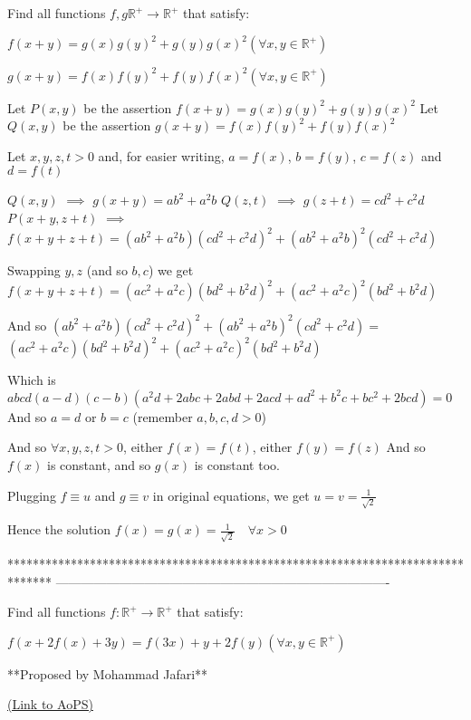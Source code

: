 \begin{solution}
	\begin{tcolorbox}Find all functions $f,g \mathbb{R}^{+} \to \mathbb{R}^{+}$ that satisfy:

$f(x+y)=g(x)g(y)^2+g(y)g(x)^2 (\forall x,y \in \mathbb{R}^{+})$

$g(x+y)=f(x)f(y)^2+f(y)f(x)^2 (\forall x,y \in \mathbb{R}^{+})$\end{tcolorbox}
Let $P(x,y)$ be the assertion $f(x+y)=g(x)g(y)^2+g(y)g(x)^2$
Let $Q(x,y)$ be the assertion $g(x+y)=f(x)f(y)^2+f(y)f(x)^2$

Let $x,y,z,t>0$ and, for easier writing, $a=f(x)$, $b=f(y)$, $c=f(z)$ and $d=f(t)$

$Q(x,y)$ $\implies$ $g(x+y)=ab^2+a^2b$
$Q(z,t)$ $\implies$ $g(z+t)=cd^2+c^2d$
$P(x+y,z+t)$ $\implies$ 
$f(x+y+z+t)=(ab^2+a^2b)(cd^2+c^2d)^2+(ab^2+a^2b)^2(cd^2+c^2d)$

Swapping $y,z$ (and so $b,c$) we get
$f(x+y+z+t)=(ac^2+a^2c)(bd^2+b^2d)^2+(ac^2+a^2c)^2(bd^2+b^2d)$

And so $(ab^2+a^2b)(cd^2+c^2d)^2+(ab^2+a^2b)^2(cd^2+c^2d)=$ $(ac^2+a^2c)(bd^2+b^2d)^2+(ac^2+a^2c)^2(bd^2+b^2d)$

Which is $abcd(a-d)(c-b)(a^2d+2abc+2abd+2acd+ad^2+b^2c+bc^2+2bcd)=0$
And so $a=d$ or $b=c$ (remember $a,b,c,d>0$)

And so $\forall x,y,z,t>0$, either $f(x)=f(t)$, either $f(y)=f(z)$
And so $f(x)$ is constant, and so $g(x)$ is constant too.

Plugging $f\equiv u$ and $g\equiv v$ in original equations, we get $u=v=\frac 1{\sqrt 2}$

Hence the solution $\boxed{f(x)=g(x)=\frac 1{\sqrt 2}\quad\forall x>0}$


\end{solution}
*******************************************************************************
-------------------------------------------------------------------------------

\begin{problem}
	Find all functions $f: \mathbb{R}^{+} \to \mathbb{R}^{+}$ that satisfy:

$f(x+2f(x)+3y)=f(3x)+y+2f(y) (\forall x,y \in \mathbb{R}^{+})$

**Proposed by Mohammad Jafari**


	\flushright \href{https://artofproblemsolving.com/community/c6h1611707}{(Link to AoPS)}
\end{problem}



